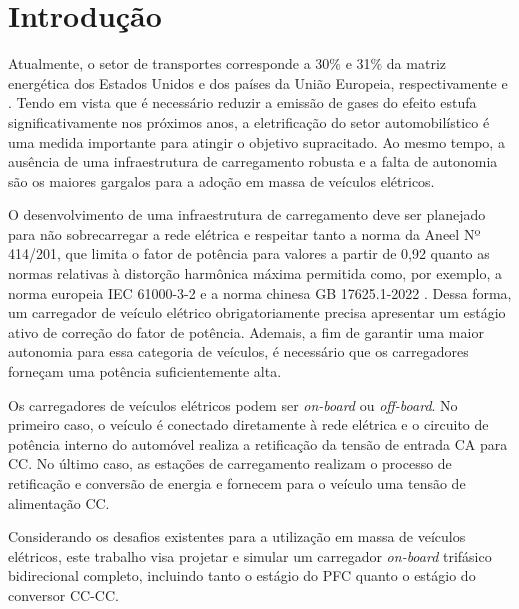 \chapter{Introdução}
Atualmente, o setor de transportes corresponde a 30\% e 31\% da matriz energética dos Estados
Unidos e dos países da União Europeia, respectivamente \cite{eia_transportation_energy} e
\cite{eurostat_transport_energy}. Tendo em vista que é necessário reduzir a emissão de gases do
efeito estufa significativamente nos próximos anos, a eletrificação do setor automobilístico é
uma medida importante para atingir o objetivo supracitado. Ao mesmo tempo, a ausência de uma
infraestrutura de carregamento robusta e a falta de autonomia são os maiores gargalos para a
adoção em massa de veículos elétricos.

O desenvolvimento de uma infraestrutura de carregamento deve ser planejado para não
sobrecarregar a rede elétrica e respeitar tanto a norma da Aneel Nº 414/201, que limita o fator
de potência para valores a partir de 0,92 quanto as normas relativas à distorção harmônica
máxima permitida como, por exemplo, a norma europeia IEC 61000-3-2 e a norma chinesa GB
17625.1-2022 . Dessa forma, um carregador de veículo elétrico obrigatoriamente precisa
apresentar um estágio ativo de correção do fator de potência. Ademais, a fim de garantir uma
maior autonomia para essa categoria de veículos, é necessário que os carregadores forneçam uma
potência suficientemente alta.

Os carregadores de veículos elétricos podem ser \emph{on-board} ou \emph{off-board}. No
primeiro caso, o veículo é conectado diretamente à rede elétrica e o circuito de potência
interno do automóvel realiza a retificação da tensão de entrada CA para CC. No último caso, as
estações de carregamento realizam o processo de retificação e conversão de energia e fornecem
para o veículo uma tensão de alimentação CC.

Considerando os desafios existentes para a utilização em massa de veículos elétricos, este
trabalho visa projetar e simular um carregador \emph{on-board} trifásico bidirecional completo,
incluindo tanto o estágio do PFC quanto o estágio do conversor CC-CC.
